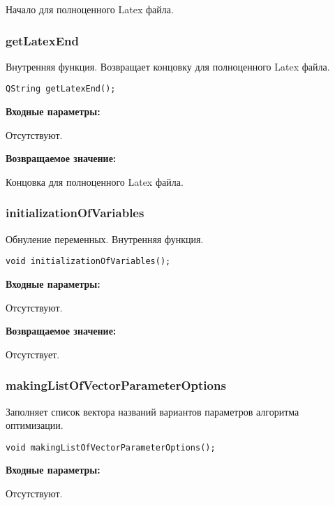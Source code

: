 Начало для полноценного Latex файла.


\subsubsection{getLatexEnd}\label{getLatexEnd}

Внутренняя функция. Возвращает концовку для полноценного Latex файла.


\begin{lstlisting}[label=code_syntax_getLatexEnd,caption=Синтаксис]
QString getLatexEnd();
\end{lstlisting}

\textbf{Входные параметры:}

Отсутствуют.

\textbf{Возвращаемое значение:}

Концовка для полноценного Latex файла.


\subsubsection{initializationOfVariables}\label{initializationOfVariables}

Обнуление переменных. Внутренняя функция.


\begin{lstlisting}[label=code_syntax_initializationOfVariables,caption=Синтаксис]
void initializationOfVariables();
\end{lstlisting}

\textbf{Входные параметры:}

Отсутствуют.

\textbf{Возвращаемое значение:}

Отсутствует.


\subsubsection{makingListOfVectorParameterOptions}\label{makingListOfVectorParameterOptions}

Заполняет список вектора названий вариантов параметров алгоритма оптимизации.


\begin{lstlisting}[label=code_syntax_makingListOfVectorParameterOptions,caption=Синтаксис]
void makingListOfVectorParameterOptions();
\end{lstlisting}

\textbf{Входные параметры:}

Отсутствуют.

